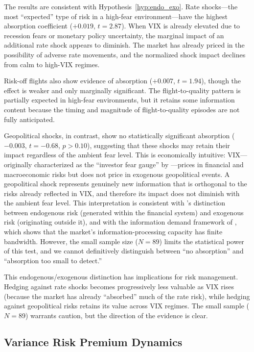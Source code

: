 \documentclass[12pt,a4paper]{article}
\begin{document}
The results are consistent with Hypothesis~\ref{hyp:endo_exo}. Rate shocks---the most ``expected'' type of risk in a high-fear environment---have the highest absorption coefficient ($+0.019$, $t = 2.87$). When VIX is already elevated due to recession fears or monetary policy uncertainty, the marginal impact of an additional rate shock appears to diminish. The market has already priced in the possibility of adverse rate movements, and the normalized shock impact declines from calm to high-VIX regimes.

Risk-off flights also show evidence of absorption ($+0.007$, $t = 1.94$), though the effect is weaker and only marginally significant. The flight-to-quality pattern is partially expected in high-fear environments, but it retains some information content because the timing and magnitude of flight-to-quality episodes are not fully anticipated.

Geopolitical shocks, in contrast, show no statistically significant absorption ($-0.003$, $t = -0.68$, $p > 0.10$), suggesting that these shocks may retain their impact regardless of the ambient fear level. This is economically intuitive: VIX---originally characterized as the ``investor fear gauge'' by \citet{whaley2000}---prices in financial and macroeconomic risks but does not price in exogenous geopolitical events. A geopolitical shock represents genuinely new information that is orthogonal to the risks already reflected in VIX, and therefore its impact does not diminish with the ambient fear level. This interpretation is consistent with \citet{danielsson2018}'s distinction between endogenous risk (generated within the financial system) and exogenous risk (originating outside it), and with the information demand framework of \citet{vlastakis2012}, which shows that the market's information-processing capacity has finite bandwidth. However, the small sample size ($N = 89$) limits the statistical power of this test, and we cannot definitively distinguish between ``no absorption'' and ``absorption too small to detect.''

This endogenous/exogenous distinction has implications for risk management. Hedging against rate shocks becomes progressively less valuable as VIX rises (because the market has already ``absorbed'' much of the rate risk), while hedging against geopolitical risks retains its value across VIX regimes. The small sample ($N = 89$) warrants caution, but the direction of the evidence is clear.

\subsection{Variance Risk Premium Dynamics}
\label{sec:vrp}
\end{document}
